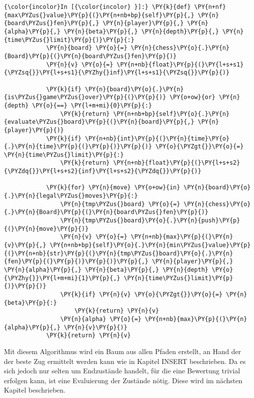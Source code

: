     \begin{Verbatim}[commandchars=\\\{\}]
{\color{incolor}In [{\color{incolor} }]:} \PY{k}{def} \PY{n+nf}{max\PYZus{}value}\PY{p}{(}\PY{n+nb+bp}{self}\PY{p}{,} \PY{n}{board\PYZus{}fen}\PY{p}{,} \PY{n}{player}\PY{p}{,} \PY{n}{alpha}\PY{p}{,} \PY{n}{beta}\PY{p}{,} \PY{n}{depth}\PY{p}{,} \PY{n}{time\PYZus{}limit}\PY{p}{)}\PY{p}{:}
            \PY{n}{board} \PY{o}{=} \PY{n}{chess}\PY{o}{.}\PY{n}{Board}\PY{p}{(}\PY{n}{board\PYZus{}fen}\PY{p}{)}
            \PY{n}{v} \PY{o}{=} \PY{n+nb}{float}\PY{p}{(}\PY{l+s+s1}{\PYZsq{}}\PY{l+s+s1}{\PYZhy{}inf}\PY{l+s+s1}{\PYZsq{}}\PY{p}{)}
        
            \PY{k}{if} \PY{n}{board}\PY{o}{.}\PY{n}{is\PYZus{}game\PYZus{}over}\PY{p}{(}\PY{p}{)} \PY{o+ow}{or} \PY{n}{depth} \PY{o}{==} \PY{l+m+mi}{0}\PY{p}{:}
                \PY{k}{return} \PY{n+nb+bp}{self}\PY{o}{.}\PY{n}{evaluate\PYZus{}board}\PY{p}{(}\PY{n}{board}\PY{p}{,} \PY{n}{player}\PY{p}{)}
            \PY{k}{if} \PY{n+nb}{int}\PY{p}{(}\PY{n}{time}\PY{o}{.}\PY{n}{time}\PY{p}{(}\PY{p}{)}\PY{p}{)} \PY{o}{\PYZgt{}}\PY{o}{=} \PY{n}{time\PYZus{}limit}\PY{p}{:}
                \PY{k}{return} \PY{n+nb}{float}\PY{p}{(}\PY{l+s+s2}{\PYZdq{}}\PY{l+s+s2}{inf}\PY{l+s+s2}{\PYZdq{}}\PY{p}{)}
        
            \PY{k}{for} \PY{n}{move} \PY{o+ow}{in} \PY{n}{board}\PY{o}{.}\PY{n}{legal\PYZus{}moves}\PY{p}{:}
                \PY{n}{tmp\PYZus{}board} \PY{o}{=} \PY{n}{chess}\PY{o}{.}\PY{n}{Board}\PY{p}{(}\PY{n}{board\PYZus{}fen}\PY{p}{)}
                \PY{n}{tmp\PYZus{}board}\PY{o}{.}\PY{n}{push}\PY{p}{(}\PY{n}{move}\PY{p}{)}
                \PY{n}{v} \PY{o}{=} \PY{n+nb}{max}\PY{p}{(}\PY{n}{v}\PY{p}{,} \PY{n+nb+bp}{self}\PY{o}{.}\PY{n}{min\PYZus{}value}\PY{p}{(}\PY{n+nb}{str}\PY{p}{(}\PY{n}{tmp\PYZus{}board}\PY{o}{.}\PY{n}{fen}\PY{p}{(}\PY{p}{)}\PY{p}{)}\PY{p}{,} \PY{n}{player}\PY{p}{,} \PY{n}{alpha}\PY{p}{,} \PY{n}{beta}\PY{p}{,} \PY{n}{depth} \PY{o}{\PYZhy{}}\PY{l+m+mi}{1}\PY{p}{,} \PY{n}{time\PYZus{}limit}\PY{p}{)}\PY{p}{)}
                \PY{k}{if} \PY{n}{v} \PY{o}{\PYZgt{}}\PY{o}{=} \PY{n}{beta}\PY{p}{:}
                    \PY{k}{return} \PY{n}{v}
                \PY{n}{alpha} \PY{o}{=} \PY{n+nb}{max}\PY{p}{(}\PY{n}{alpha}\PY{p}{,} \PY{n}{v}\PY{p}{)}
            \PY{k}{return} \PY{n}{v}
\end{Verbatim}

    Mit diesem Algorithmus wird ein Baum aus allen Pfaden erstellt, an Hand
der der beste Zug ermittelt werden kann wie in Kapitel INSERT
beschrieben. Da es sich jedoch nur selten um Endzustände handelt, für
die eine Bewertung trivial erfolgen kann, ist eine Evaluierung der
Zustände nötig. Diese wird im nächsten Kapitel beschrieben.

